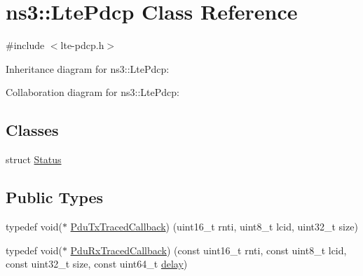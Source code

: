 \hypertarget{classns3_1_1LtePdcp}{}\section{ns3\+:\+:Lte\+Pdcp Class Reference}
\label{classns3_1_1LtePdcp}


{\ttfamily \#include $<$lte-\/pdcp.\+h$>$}



Inheritance diagram for ns3\+:\+:Lte\+Pdcp\+:


Collaboration diagram for ns3\+:\+:Lte\+Pdcp\+:
\subsection*{Classes}
\begin{DoxyCompactItemize}
\item 
struct \hyperlink{structns3_1_1LtePdcp_1_1Status}{Status}
\end{DoxyCompactItemize}
\subsection*{Public Types}
\begin{DoxyCompactItemize}
\item 
typedef void($\ast$ \hyperlink{classns3_1_1LtePdcp_ab48ff618f702ec3d74e45880df4a6eda}{Pdu\+Tx\+Traced\+Callback}) (uint16\+\_\+t rnti, uint8\+\_\+t lcid, uint32\+\_\+t size)
\item 
typedef void($\ast$ \hyperlink{classns3_1_1LtePdcp_ae8e4aa54be6c2709fadd32cc6f51e647}{Pdu\+Rx\+Traced\+Callback}) (const uint16\+\_\+t rnti, const uint8\+\_\+t lcid, const uint32\+\_\+t size, const uint64\+\_\+t \hyperlink{mmwave_2model_2fading-traces_2fading__trace__generator_8m_a7964e6aa8f61a9d28973c8267a606ad8}{delay})
\end{DoxyCompactItemize}
